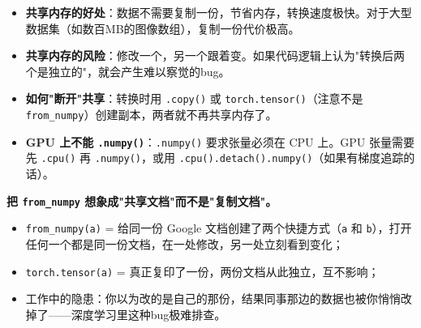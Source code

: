 \documentclass[a4paper,11pt]{ctexart}
\begin{document}
\begin{beginnerbox}
    \begin{itemize}
        \item \textbf{共享内存的好处}：数据不需要复制一份，节省内存，转换速度极快。对于大型数据集（如数百MB的图像数组），复制一份代价极高。
        \item \textbf{共享内存的风险}：修改一个，另一个跟着变。如果代码逻辑上认为"转换后两个是独立的"，就会产生难以察觉的bug。
        \item \textbf{如何"断开"共享}：转换时用 \texttt{.copy()} 或 \texttt{torch.tensor()}（注意不是 \texttt{from\_numpy}）创建副本，两者就不再共享内存了。
        \item \textbf{GPU 上不能 \texttt{.numpy()}}：\texttt{.numpy()} 要求张量必须在 CPU 上。GPU 张量需要先 \texttt{.cpu()} 再 \texttt{.numpy()}，或用 \texttt{.cpu().detach().numpy()}（如果有梯度追踪的话）。
    \end{itemize}
\end{beginnerbox}

\begin{metaphorbox}
    \textbf{把 \texttt{from\_numpy} 想象成"共享文档"而不是"复制文档"。}

    \begin{itemize}
        \item \texttt{from\_numpy(a)} = 给同一份 Google 文档创建了两个快捷方式（\texttt{a} 和 \texttt{b}），打开任何一个都是同一份文档，在一处修改，另一处立刻看到变化；
        \item \texttt{torch.tensor(a)} = 真正复印了一份，两份文档从此独立，互不影响；
        \item 工作中的隐患：你以为改的是自己的那份，结果同事那边的数据也被你悄悄改掉了——深度学习里这种bug极难排查。
    \end{itemize}
\end{metaphorbox}
\end{document}
